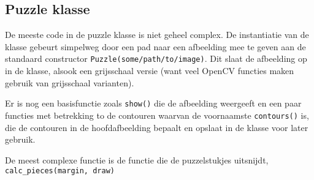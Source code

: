 \subsection{Puzzle klasse}

De meeste code in de puzzle klasse is niet geheel complex. De instantiatie van de klasse gebeurt simpelweg door een pad naar een afbeelding mee te geven aan de standaard constructor
\texttt{Puzzle(some/path/to/image)}. Dit slaat de afbeelding op in de klasse, alsook een grijsschaal versie (want veel OpenCV functies maken gebruik van grijsschaal varianten).

Er is nog een basisfunctie zoals \texttt{show()} die de afbeelding weergeeft en een paar functies met betrekking to de contouren waarvan de voornaamste \texttt{contours()} is, die de contouren 
in de hoofdafbeelding bepaalt en opslaat in de klasse voor later gebruik.

De meest complexe functie is de functie die de puzzelstukjes uitsnijdt, \texttt{calc\_pieces(margin, draw)}

